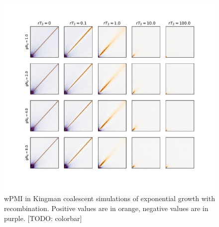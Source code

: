 \documentclass[11pt, letterpaper]{article}   	%
\begin{document}
\begin{figure}
\centering
\includegraphics[width=\textwidth]{figures/wpmi_exp_r.pdf}
\caption{wPMI in Kingman coalescent simulations of exponential growth with recombination. Positive values are in orange, negative values are in purple. [TODO: colorbar]\label{fig:wpmi_exp_r}}
\end{figure}
\end{document}
